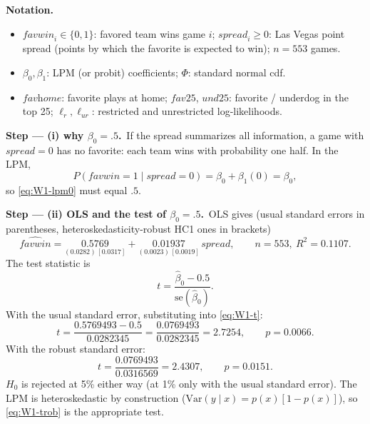 \documentclass[11pt,a4paper]{article}
\numberwithin{equation}{questao}   %
\newenvironment{notacao}{\par\smallskip\noindent\textbf{Notation.}\begin{itemize}[leftmargin=1.4em,topsep=1pt,itemsep=0pt]\small}{\end{itemize}}
\newcommand{\passo}[2]{\par\smallskip\noindent\textbf{Step --- #1.}~#2}
\begin{document}
\begin{sol}
\begin{notacao}
\item $\textit{favwin}_i\in\{0,1\}$: favored team wins game $i$; $\textit{spread}_i\ge0$: Las Vegas point
  spread (points by which the favorite is expected to win); $n=553$ games.
\item $\beta_0,\beta_1$: LPM (or probit) coefficients; $\Phi$: standard normal cdf.
\item $\textit{favhome}$: favorite plays at home; $\textit{fav25}$, $\textit{und25}$: favorite /
  underdog in the top 25; $\ell_r,\ell_{ur}$: restricted and unrestricted log-likelihoods.
\end{notacao}

\passo{(i) why $\beta_0=.5$}{If the spread summarizes all information, a game with
$\textit{spread}=0$ has no favorite: each team wins with probability one half. In the LPM,
\begin{equation}\label{eq:W1-lpm0}
P(\textit{favwin}=1\mid\textit{spread}=0)=\beta_0+\beta_1(0)=\beta_0,
\end{equation}
so \eqref{eq:W1-lpm0} must equal $.5$.}

\passo{(ii) OLS and the test of $\beta_0=.5$}{OLS gives (usual standard errors in parentheses,
heteroskedasticity-robust HC1 ones in brackets)
\begin{equation}\label{eq:W1-ols}
\widehat{\textit{favwin}}=\underset{(0.0282)\,[0.0317]}{0.5769}+\underset{(0.0023)\,[0.0019]}{0.01937}\,\textit{spread},\qquad n=553,\ R^2=0.1107 .
\end{equation}
The test statistic is
\begin{equation}\label{eq:W1-t}
t=\frac{\hat\beta_0-0.5}{\mathrm{se}(\hat\beta_0)} .
\end{equation}
With the usual standard error, substituting into \eqref{eq:W1-t}:
\begin{equation}\label{eq:W1-tus}
t=\frac{0.5769493-0.5}{0.0282345}=\frac{0.0769493}{0.0282345}=2.7254,\qquad p=0.0066 .
\end{equation}
With the robust standard error:
\begin{equation}\label{eq:W1-trob}
t=\frac{0.0769493}{0.0316569}=2.4307,\qquad p=0.0151 .
\end{equation}
$H_0$ is rejected at 5\% either way (at 1\% only with the usual standard error). The LPM is
heteroskedastic by construction ($\mathrm{Var}(y\mid x)=p(x)[1-p(x)]$), so \eqref{eq:W1-trob} is the
appropriate test.}


\end{sol}
\end{document}
